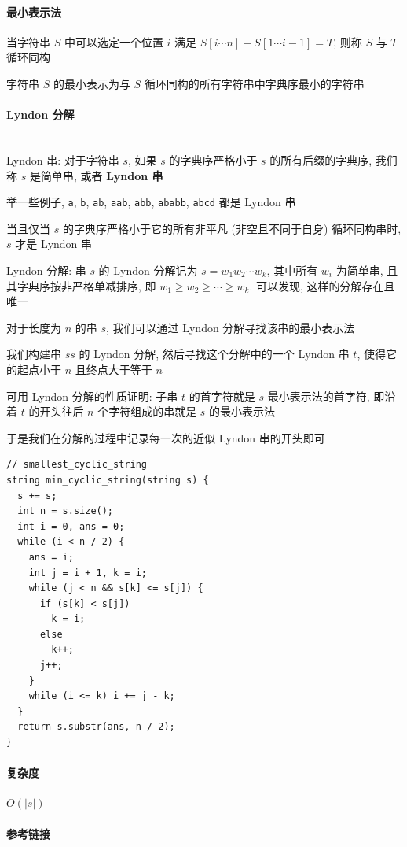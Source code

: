 \paragraph{最小表示法}

当字符串 \(S\) 中可以选定一个位置 \(i\) 满足 \(S[i\cdots n]+S[1\cdots i-1]=T\), 则称 \(S\) 与 \(T\) 循环同构

字符串 \(S\) 的最小表示为与 \(S\) 循环同构的所有字符串中字典序最小的字符串

\paragraph{Lyndon 分解}~\\

Lyndon 串: 对于字符串 \(s\), 如果 \(s\) 的字典序严格小于 \(s\) 的所有后缀的字典序, 我们称 \(s\) 是简单串, 或者 \textbf{Lyndon 串}

举一些例子, \verb|a|, \verb|b|, \verb|ab|, \verb|aab|, \verb|abb|, \verb|ababb|, \verb|abcd| 都是 Lyndon 串

当且仅当 \(s\) 的字典序严格小于它的所有非平凡 (非空且不同于自身) 循环同构串时, \(s\) 才是 Lyndon 串

Lyndon 分解: 串 \(s\) 的 Lyndon 分解记为 \(s=w_1w_2\cdots w_k\), 其中所有 \(w_i\) 为简单串, 且其字典序按非严格单减排序, 即 \(w_1\ge w_2\ge\cdots\ge w_k\). 可以发现, 这样的分解存在且唯一

对于长度为 \(n\) 的串 \(s\), 我们可以通过 Lyndon 分解寻找该串的最小表示法

我们构建串 \(ss\) 的 Lyndon 分解, 然后寻找这个分解中的一个 Lyndon 串 \(t\), 使得它的起点小于 \(n\) 且终点大于等于 \(n\)

可用 Lyndon 分解的性质证明: 子串 \(t\) 的首字符就是 \(s\) 最小表示法的首字符, 即沿着 \(t\) 的开头往后 \(n\) 个字符组成的串就是 \(s\) 的最小表示法

于是我们在分解的过程中记录每一次的近似 Lyndon 串的开头即可

\begin{verbatim}
// smallest_cyclic_string
string min_cyclic_string(string s) {
  s += s;
  int n = s.size();
  int i = 0, ans = 0;
  while (i < n / 2) {
    ans = i;
    int j = i + 1, k = i;
    while (j < n && s[k] <= s[j]) {
      if (s[k] < s[j])
        k = i;
      else
        k++;
      j++;
    }
    while (i <= k) i += j - k;
  }
  return s.substr(ans, n / 2);
}
\end{verbatim}

\paragraph{复杂度} \(O(|s|)\)

\paragraph{参考链接}  

